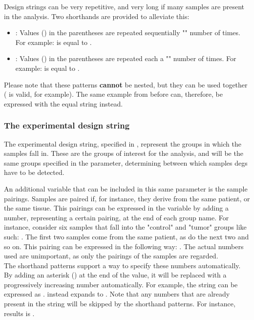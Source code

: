 Design strings can be very repetitive, and very long if many samples are present in the analysis. Two shorthands are provided to alleviate this:
\begin{itemize}
    \item {}: Values () in the parentheses are repeated sequentially "" number of times. For example:  is equal to .
    \item {}: Values () in the parentheses are repeated each a "" number of times. For example:  is equal to .
\end{itemize}

Please note that these patterns \textbf{cannot} be nested, but they can be used together ( is valid, for example). The same example from before can, therefore, be expressed with the equal string  instead.

\subsubsection{The experimental design string}
The experimental design string, specified in , represent the groups in which the samples fall in. These are the groups of interest for the analysis, and will be the same groups specified in the  parameter, determining between which samples \glspl{deg} have to be detected.

An additional variable that can be included in this same parameter is the sample pairings. Samples are paired if, for instance, they derive from the same patient, or the same tissue. This pairings can be expressed in the variable by adding a number, representing a certain pairing, at the end of each group name. For instance, consider six samples that fall into the "control" and "tumor" groups like such: . The first two samples come from the same patient, as do the next two and so on. This pairing can be expressed in the following way: . The actual numbers used are unimportant, as only the pairings of the samples are regarded.\\
The shorthand patterns support a way to specify these numbers automatically. By adding an asterisk (\mono{*}) at the end of the value, it will be replaced with a progressively increasing number automatically. For example, the string  can be expressed as .  instead expands to . Note that any numbers that are already present in the string will be skipped by the shorthand patterns. For instance,  results is .

